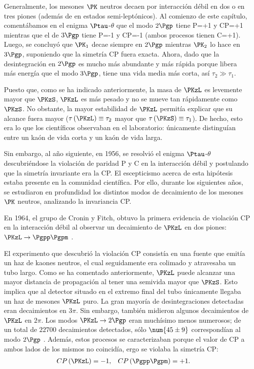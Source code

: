Generalmente, los mesones $\PK$ neutros decaen por interacción débil en dos o en tres piones (además de en estados semi-leptónicos). Al comienzo de este capítulo, comentábamos en el enigma $\Ptau$-$\theta$ que el modo $2\Pgp$ tiene P=+1 y CP=+1 mientras que el de $3\Pgp$ tiene P=-1 y CP=-1 (ambos procesos tienen C=+1). Luego, se concluyó que $\PK_{1}$ decae siempre en $2\Pgp$ mientras $\PK_{2}$ lo hace en $3\Pgp$, suponiendo que la simetría CP fuera exacta. Ahora, dado que la desintegración en $2\Pgp$ es mucho más abundante y más rápida porque libera más energía que el modo $3\Pgp$, tiene una vida media más corta, así $\tau_{2} \gg \tau_{1}$. 

Puesto que, como se ha indicado anteriormente, la masa de $\PKzL$ es levemente mayor que $\PKzS$, $\PKzL$ es más pesado y no se mueve tan rápidamente como $\PKzS$. No obstante, la mayor estabilidad de $\PKzL$ permitía explicar que su alcance fuera mayor ($\tau\left(\PKzL\right)\equiv \tau_{2}$ mayor que $\tau\left(\PKzS\right) \equiv \tau_{1}$). De hecho, esto era lo que los científicos observaban en el laboratorio: únicamente distinguían entre un kaón de vida corta y un kaón de vida larga.

Sin embargo, al año siguiente, en 1956, se resolvió el enigma $\Ptau$-$\theta$ descubriéndose la violación de paridad P y C en la interacción débil y postulando que la simetría invariante era la CP. El escepticismo acerca de esta hipótesis estaba presente en la comunidad científica. Por ello, durante los siguientes años, se estudiaron en profundidad los distintos modos de decaimiento de los mesones $\PK$ neutros, analizando la invariancia CP.

En 1964, el grupo de Cronin y Fitch, obtuvo la primera evidencia de violación CP en la interacción débil al observar un decaimiento de $\PKzL$ en dos piones: $\PKzL \rightarrow \Pgpp\Pgpm$ \cite{Cronin}.

El experimento que descubrió la violación CP consistía en una fuente que emitía un haz de kaones neutros, el cual seguidamente era colimado y atravesaba un tubo largo. Como se ha comentado anteriormente, $\PKzL$ puede alcanzar una mayor distancia de propagación al tener una semivida mayor que $\PKzS$. Esto implica que al detector situado en el extremo final del tubo únicamente llegaba un haz de mesones $\PKzL$ puro. La gran mayoría de desintegraciones detectadas eran decaimientos en $3\pi$. Sin embargo, también midieron algunos decaimientos de $\PKzL$ en $2\pi$. Los modos $\PKzL \rightarrow 2\Pgp$ eran muchísimo menos numerosos; de un total de $\num{22700}$ decaimientos detectados, sólo $\num{45 \pm 9}$ correspondían al modo $2\Pgp$ \cite{Cronin}. Además, estos procesos se caracterizaban porque el valor de CP a ambos lados de los mismos no coincidía, ergo se violaba la simetría CP:
\begin{align}
CP\left(\PKzL\right) &=-1, & CP\left(\Pgpp\Pgpm\right) &= +1.
\end{align}

